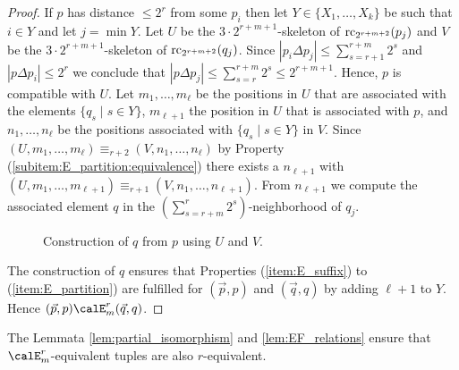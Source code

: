 \begin{proof}
	If $p$ has distance $\leq 2^{r}$ from some $p_i$ then let $Y\in \{X_1,\ldots,X_k\}$ be such that $i\in Y$ and let $j=\min Y$. Let $U$ be the $3\cdot 2^{r+m+1}$-skeleton of $\operatorname{rc}_{2^{r+m+2}}(p_j)$ and 
	$V$ be the $3\cdot 2^{r+m+1}$-skeleton of $\operatorname{rc}_{2^{r+m+2}}(q_j)$.
	Since $|p_i\Delta p_j| \leq \sum_{s=r+1}^{r+m} 2^s$ and $|p\Delta p_i| \leq 2^r$ we conclude that $|p\Delta p_j| \leq \sum_{s=r}^{r+m} 2^s \leq 2^{r+m+1}$. Hence, $p$ is compatible with $U$. Let $m_1,\ldots,m_\ell$ be the positions in $U$ that are associated with the elements $\{q_s \mid s\in Y\}$, $m_{\ell+1}$ the position in $U$ that is associated with $p$, and $n_1,\ldots,n_\ell$ be the positions associated with $\{q_s \mid s\in Y\}$ in $V$. Since $(U,m_1,\ldots,m_\ell) \equiv_{r+2} (V,n_1,\ldots,n_\ell)$ by Property (\ref{subitem:E_partition:equivalence}) there exists a $n_{\ell+1}$ with $(U,m_1,\ldots,m_{\ell+1}) \equiv_{r+1} (V,n_1,\ldots,n_{\ell+1})$. From $n_{\ell+1}$ we compute the associated element $q$
	in the $(\sum_{s= r+m}^{r} 2^s)$-neighborhood of $q_j$.
	\begin{figure}[h]
		\centering
		\caption{\label{fig:skeleton}Construction of $q$ from $p$ using $U$ and $V$.}
	\end{figure}
	The construction of $q$ ensures that Properties (\ref{item:E_suffix}) to (\ref{item:E_partition}) are fulfilled for $(\vec{p}, p)$ and $(\vec{q}, q)$ by adding $\ell+1$ to $Y$. Hence $(\vec{p}, p) \calE^r_m (\vec{q}, q)$.
\end{proof}

The Lemmata \ref{lem:partial_isomorphism} and \ref{lem:EF_relations} ensure that $\calE^r_m$-equivalent tuples are also $r$-equivalent.

